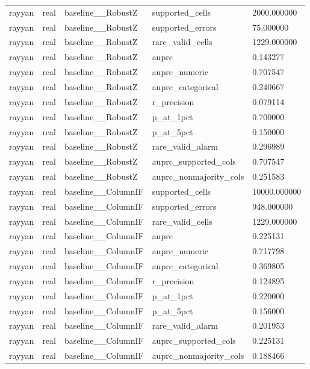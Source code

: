 \begin{tabular}{lllll}
rayyan & real & baseline\_\_RobustZ & supported\_cells & 2000.000000 \\
rayyan & real & baseline\_\_RobustZ & supported\_errors & 75.000000 \\
rayyan & real & baseline\_\_RobustZ & rare\_valid\_cells & 1229.000000 \\
rayyan & real & baseline\_\_RobustZ & auprc & 0.143277 \\
rayyan & real & baseline\_\_RobustZ & auprc\_numeric & 0.707547 \\
rayyan & real & baseline\_\_RobustZ & auprc\_categorical & 0.240667 \\
rayyan & real & baseline\_\_RobustZ & r\_precision & 0.079114 \\
rayyan & real & baseline\_\_RobustZ & p\_at\_1pct & 0.700000 \\
rayyan & real & baseline\_\_RobustZ & p\_at\_5pct & 0.150000 \\
rayyan & real & baseline\_\_RobustZ & rare\_valid\_alarm & 0.296989 \\
rayyan & real & baseline\_\_RobustZ & auprc\_supported\_cols & 0.707547 \\
rayyan & real & baseline\_\_RobustZ & auprc\_nonmajority\_cols & 0.251583 \\
rayyan & real & baseline\_\_ColumnIF & supported\_cells & 10000.000000 \\
rayyan & real & baseline\_\_ColumnIF & supported\_errors & 948.000000 \\
rayyan & real & baseline\_\_ColumnIF & rare\_valid\_cells & 1229.000000 \\
rayyan & real & baseline\_\_ColumnIF & auprc & 0.225131 \\
rayyan & real & baseline\_\_ColumnIF & auprc\_numeric & 0.717798 \\
rayyan & real & baseline\_\_ColumnIF & auprc\_categorical & 0.369805 \\
rayyan & real & baseline\_\_ColumnIF & r\_precision & 0.124895 \\
rayyan & real & baseline\_\_ColumnIF & p\_at\_1pct & 0.220000 \\
rayyan & real & baseline\_\_ColumnIF & p\_at\_5pct & 0.156000 \\
rayyan & real & baseline\_\_ColumnIF & rare\_valid\_alarm & 0.201953 \\
rayyan & real & baseline\_\_ColumnIF & auprc\_supported\_cols & 0.225131 \\
rayyan & real & baseline\_\_ColumnIF & auprc\_nonmajority\_cols & 0.188466 \\

\end{tabular}
